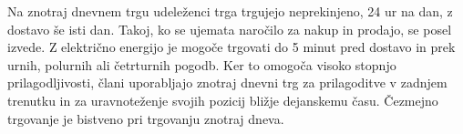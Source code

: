 \documentclass[12pt,a4paper]{amsart}
\theoremstyle{definition} %
\theoremstyle{plain} %
\begin{document}
{Na znotraj dnevnem trgu udeleženci trga trgujejo neprekinjeno, 24 ur na dan, z dostavo še isti dan. Takoj, ko se ujemata naročilo za nakup in prodajo, se posel izvede. Z električno energijo je mogoče trgovati do 5 minut pred dostavo in prek urnih, polurnih ali četrturnih pogodb. Ker to omogoča visoko stopnjo prilagodljivosti, člani uporabljajo znotraj dnevni trg za prilagoditve v zadnjem trenutku in za uravnoteženje svojih pozicij bližje dejanskemu času. Čezmejno trgovanje je bistveno pri trgovanju znotraj dneva. 

}
\end{document}

